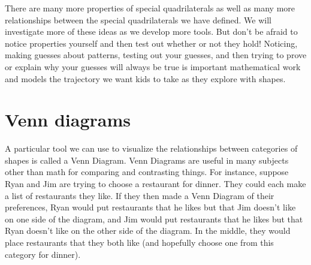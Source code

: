 \documentclass{ximera}
\begin{document}
There are many more properties of special quadrilaterals as well as many more relationships between the special quadrilaterals we have defined. We will investigate more of these ideas as we develop more tools. But don't be afraid to notice properties yourself and then test out whether or not they hold! Noticing, making guesses about patterns, testing out your guesses, and then trying to prove or explain why your guesses will always be true is important mathematical work and models the trajectory we want kids to take as they explore with shapes.

\section{Venn diagrams}

A particular tool we can use to visualize the relationships between categories of shapes is called a Venn Diagram. Venn Diagrams are useful in many subjects other than math for comparing and contrasting things. For instance, suppose Ryan and Jim are trying to choose a restaurant for dinner. They could each make a list of restaurants they like. If they then made a Venn Diagram of their preferences, Ryan would put restaurants that he likes but that Jim doesn't like on one side of the diagram, and Jim would put restaurants that he likes but that Ryan doesn't like on the other side of the diagram. In the middle, they would place restaurants that they both like (and hopefully choose one from this category for dinner).

\begin{center}
\end{center}
\end{document}
